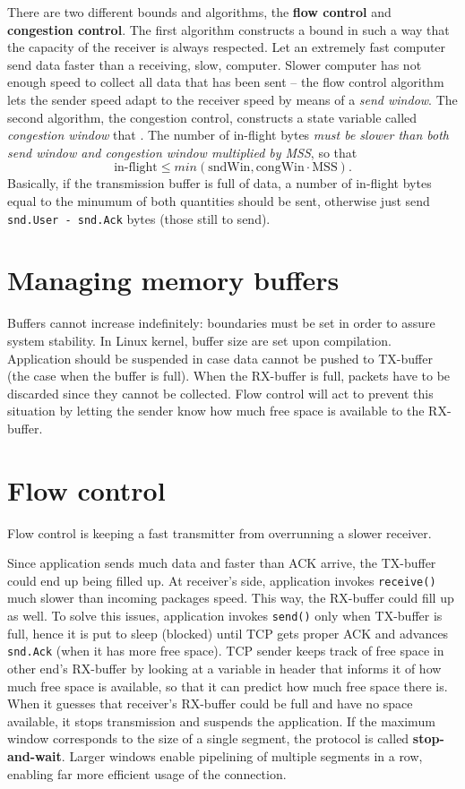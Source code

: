 \documentclass[a4paper, 11pt]{report}
\begin{document}
There are two different bounds and algorithms, the \textbf{flow control} and
\textbf{congestion control}. The first algorithm constructs a bound in such a
way that the capacity of the receiver is always respected. Let an extremely
fast computer send data faster than a receiving, slow, computer. Slower
computer has not enough speed to collect all data that has been sent \--- the
flow control algorithm lets the sender speed adapt to the receiver speed by
means of a \emph{send window}. The second algorithm, the congestion control,
constructs a state variable called \emph{congestion window} that . The number
of in-flight bytes \emph{must be slower than both send window and congestion
window multiplied by MSS}, so that $$\mbox{in-flight} \leq min(\mbox{sndWin},
\mbox{congWin} \cdot \mbox{MSS}).$$ Basically, if the transmission buffer is full of data,
a number of in-flight bytes equal to the minumum of both quantities should be
sent, otherwise just send \texttt{snd.User - snd.Ack} bytes (those still to
send).

\section{Managing memory buffers}

Buffers cannot increase indefinitely: boundaries must be set in order to assure
system stability. In Linux kernel, buffer size are set upon compilation.
Application should be suspended in case data cannot be pushed to TX-buffer (the
case when the buffer is full). When the RX-buffer is full, packets have to be
discarded since they cannot be collected. Flow control will act to prevent this
situation by letting the sender know how much free space is available to the
RX-buffer.

\section{Flow control}

Flow control is keeping a fast transmitter from overrunning a slower receiver.

Since application sends much data and faster than ACK arrive, the TX-buffer
could end up being filled up. At receiver's side, application invokes
\texttt{receive()} much slower than incoming packages speed. This way, the
RX-buffer could fill up as well. To solve this issues, application invokes
\texttt{send()} only when TX-buffer is full, hence it is put to sleep (blocked)
until TCP gets proper ACK and advances \texttt{snd.Ack} (when it has more free
space). TCP sender keeps track of free space in other end's RX-buffer by
looking at a variable in header that informs it of how much free space is
available, so that it can predict how much free space there is. When it guesses
that receiver's RX-buffer could be full and have no space available, it stops
transmission and suspends the application. If the maximum window corresponds to
the size of a single segment, the protocol is called \textbf{stop-and-wait}.
Larger windows enable pipelining of multiple segments in a row, enabling far
more efficient usage of the connection.
\end{document}
